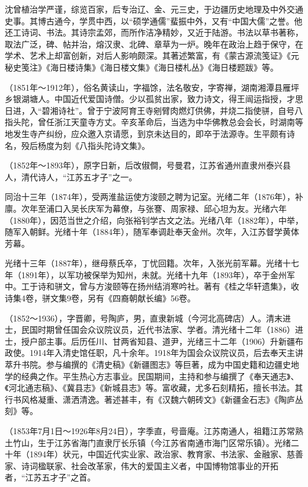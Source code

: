 \begin{description}
        沈曾植治学严谨，综览百家，后专治辽、金、元三史，于边疆历史地理及中外交通史事。其博古通今，学贯中西，以“硕学通儒”蜚振中外，又有“中国大儒”之誉。他还工诗词、书法。其诗宗孟郊，而所作洁净精妙，又近于陆游。书法以草书著称，取法广泛，碑、帖并治，熔汉隶、北碑、章草为一炉。晚年在政治上趋于保守，在学术、艺术上却富创新，对后人影响颇深。其著述繁富，有《蒙古源流笺证》《元秘史笺注》《海日楼诗集》《海日楼文集》《海日楼札丛》《海日楼题跋》等。
  \item[释敬安] （1851年～1912年），俗名黄读山，字福馀，法名敬安，字寄禅，湖南湘潭县雁坪乡银湖塘人。中国近代爱国诗僧。少以孤贫出家，致力诗文，得王闿运指授，才思日进，入“碧湘诗社”。曾于宁波阿育王寺剜臂肉燃灯供佛，并烧二指使骈，自号八指头陀，曾任浙江天童寺方丈。辛亥革命后，当选为中华佛教总会会长，时湖南等地发生寺产纠纷，应众邀入京请愿，到京未达目的，即卒于法源寺。生平颇有诗名，殁后杨度为刻《八指头陀诗文集》。
  \item[朱铭盘] （1852年～1893年），原字日新，后改俶僴，号曼君，江苏省通州直隶州泰兴县人，清代诗人，“江苏五才子”之一。\par
        同治十三年（1874年），受两淮盐运使方浚颐之聘为记室。光绪二年（1876年），补廪。次年至浦口入吴长庆军为幕僚，与张謇、周家禄、邱心坦为友。光绪六年（1880年），因范当世之介绍，向张裕钊学古文之法。光绪八年（1882年），中举，随军入朝鲜。光绪十年（1884年），随军奉调赴奉天金州。次年，入江苏督学黄体芳幕。\par
        光绪十三年（1887年），继母蔡氏卒，丁忧回籍。次年，入张光前军幕。光绪十七年（1891年），以军功被保举为知州，未就。光绪十九年（1893年），卒于金州军中。工于诗和骈文，曾与方浚颐等在扬州结消寒吟社。著有《桂之华轩遗集》，收诗集4卷，骈文集9卷，另有《四裔朝献长编》56卷。
  \item[王树枏] （1852～1936），字晋卿，号陶庐，男，直隶新城（今河北高碑店）人。清末进士，民国时期曾任国会众议院议员，近代书法家、学者。清光绪十二年（1886）进士，授户部主事。后历任川、甘两省知县、道尹，光绪三十二年（1906）升新疆布政使。1914年入清史馆任职，凡十余年。1918年为国会众议院议员，后去奉天主讲萃升书院。参与编撰的《清史稿》《新疆图志》等巨著，成为中国史籍和边疆史地学的经典之作。平生热心方志事业。民国期间，主持和参与编撰了《奉天通志》、《河北通志稿》、《冀县志》《新城县志》等。富收藏，尤多石刻精拓，擅长书法。其行书风格凝重、潇洒清逸。著述甚丰，有《汉魏六朝砖文》《新疆金石志》《陶庐丛刻》等。
  \item[张謇] （1853年7月1日～1926年8月24日），字季直，号啬庵。江苏南通人，祖籍江苏常熟土竹山，生于江苏省海门直隶厅长乐镇（今江苏省南通市海门区常乐镇）。光绪二十年（1894年）状元，中国近代实业家、政治家、教育家、书法家、金融家、慈善家、诗词楹联家、社会改革家，伟大的爱国主义者，中国博物馆事业的开拓者，“江苏五才子”之首。\par

\end{description}
